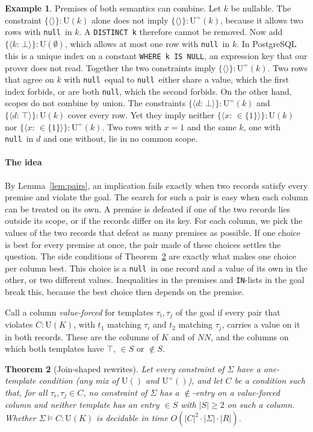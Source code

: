 \documentclass[conference]{IEEEtran}
\newtheorem{theorem}{Theorem}
\theoremstyle{definition}
\newtheorem{example}[theorem]{Example}
\newcommand{\sql}[1]{\texttt{#1}}
\newcommand{\nul}{\texttt{null}}
\newcommand{\NN}{\mathit{NN}}
\newcommand{\Sig}{\Sigma}
\newcommand{\U}[1]{\mathrm{U}(#1)}
\newcommand{\Ueq}[1]{\mathrm{U}^{=}(#1)}
\newcommand{\tpl}[1]{\ensuremath{\langle #1\rangle}}
\begin{document}
\begin{example}\label{ex:mixed}
Premises of both semantics can combine. Let $k$ be nullable. The constraint $\{\tpl{}\}:\U{k}$ alone does not imply
$\{\tpl{}\}:\Ueq{k}$, because it allows two rows with \nul\ in $k$. A \sql{DISTINCT k} therefore cannot be removed. Now add
$\{\tpl{k{:}\,\bot}\}:\U{\emptyset}$, which allows at most one row with \nul\ in $k$. In PostgreSQL this is a unique index
on a constant \sql{WHERE k IS NULL}, an expression key that our prover does not read. Together the two constraints imply
$\{\tpl{}\}:\Ueq{k}$. Two rows that agree on $k$ with \nul\ equal to \nul\ either share a value, which the first index
forbids, or are both \nul, which the second forbids. On the other hand, scopes do not combine by union. The constraints
$\{\tpl{d{:}\,\bot}\}:\Ueq{k}$ and $\{\tpl{d{:}\,\top}\}:\U{k}$ cover every row. Yet they imply neither
$\{\tpl{x{:}\,{\in}\{1\}}\}:\U{k}$ nor $\{\tpl{x{:}\,{\in}\{1\}}\}:\Ueq{k}$. Two rows with $x=1$ and the same $k$, one with
\nul\ in $d$ and one without, lie in no common scope.
\end{example}

\paragraph*{The idea} By Lemma~\ref{lem:pairs}, an implication fails exactly when two records satisfy every premise
and violate the goal. The search for such a pair is easy when each column can be treated on its own. A premise is
defeated if one of the two records lies outside its scope, or if the records differ on its key. For each column, we pick
the values of the two records that defeat as many premises as possible. If one choice is best for every premise at
once, the pair made of these choices settles the question. The side conditions of Theorem~\ref{thm:pos} are exactly
what makes one choice per column best. This choice is a \nul\ in one record and a value of its own in the other, or two
different values. Inequalities in the premises and \sql{IN}-lists in the goal break this, because the best choice then
depends on the premise.

Call a column \emph{value-forced} for templates $\tau_i,\tau_j$ of the goal if every pair that violates $C:\U{K}$, with
$t_1$ matching $\tau_i$ and $t_2$ matching $\tau_j$, carries a value on it in both records. These are the columns of $K$
and of $\NN$, and the columns on which both templates have $\top$, ${\in}S$ or ${\notin}S$.

\begin{theorem}[Join-shaped rewrites]\label{thm:pos}
Let every constraint of $\Sig$ have a one-template condition (any mix of $\U{}$ and $\Ueq{}$),
and let $C$ be a condition such that, for all $\tau_i,\tau_j\in C$, no constraint of $\Sig$ has a
${\notin}$-entry on a value-forced column and neither template has an entry ${\in}S$ with
$|S|\ge2$ on such a column. Whether $\Sig\models C:\U{K}$ is decidable in time
$O(|C|^2\cdot|\Sig|\cdot|R|)$.
\end{theorem}
\end{document}

